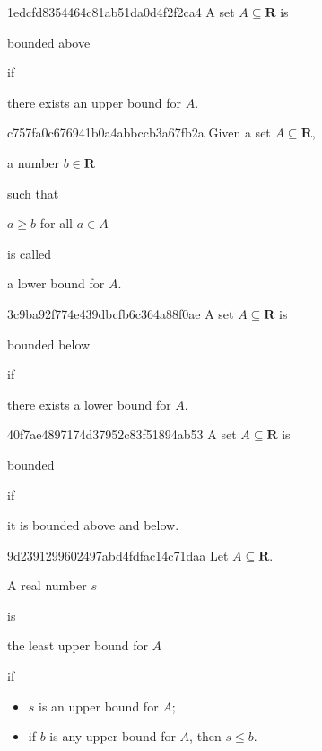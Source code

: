 \begin{note}{1edcfd8354464c81ab51da0d4f2f2ca4}
    A set \({ A \subseteq \mathbf{R} }\) is \begin{icloze}{2}bounded above\end{icloze} if \begin{icloze}{1}there exists an upper bound for \({ A }\).\end{icloze}
\end{note}

\begin{note}{c757fa0c676941b0a4abbccb3a67fb2a}
    Given a set \({ A \subseteq \mathbf{R} }\), \begin{icloze}{3}a number \({ b \in \mathbf{R} }\)\end{icloze} such that \begin{icloze}{2}\({ a \geq b }\) for all \({ a \in A }\)\end{icloze} is called \begin{icloze}{1}a lower bound for \({ A }\).\end{icloze}
\end{note}

\begin{note}{3c9ba92f774e439dbcfb6c364a88f0ae}
    A set \({ A \subseteq \mathbf{R} }\) is \begin{icloze}{2}bounded below\end{icloze} if \begin{icloze}{1}there exists a lower bound for \({ A }\).\end{icloze}
\end{note}

\begin{note}{40f7ae4897174d37952c83f51894ab53}
    A set \({ A \subseteq \mathbf{R} }\) is \begin{icloze}{2}bounded\end{icloze} if \begin{icloze}{1}it is bounded above and below.\end{icloze}
\end{note}

\begin{note}{9d2391299602497abd4fdfac14c71daa}
    Let \({ A \subseteq \mathbf{R} }\). \begin{icloze}{4}A real number \({ s }\)\end{icloze} is \begin{icloze}{3}the least upper bound for \({ A }\)\end{icloze} if
    \begin{itemize}
        \item{} \begin{icloze}{2}\({ s }\) is an upper bound for \({ A }\);\end{icloze}
        \item{} \begin{icloze}{1}if \({ b }\) is any upper bound for \({ A }\), then \({ s \leq b }\).\end{icloze}
    \end{itemize}
\end{note}


